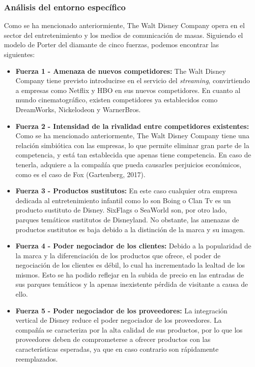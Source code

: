 \subsubsection{Análisis del entorno específico}
Como se ha mencionado anteriormiente, The Walt Disney Company opera en el sector del entretenimiento y los medios de comunicación de masas. Siguiendo el modelo de Porter del diamante de cinco fuerzas, podemos encontrar las siguientes:

\begin{itemize}

\item
\textbf{Fuerza 1 - Amenaza de nuevos competidores:} The Walt Disney Company tiene previsto introducirse en el servicio del \textit{streaming}, convirtiendo a empresas como Netflix y HBO en sus nuevos competidores. En cuanto al mundo cinematográfico, existen competidores ya establecidos como DreamWorks, Nickelodeon y WarnerBros.

\item
\textbf{Fuerza 2 - Intensidad de la rivalidad entre competidores existentes:} Como se ha mencionado anteriormente, The Walt Disney Company tiene una relación simbiótica con las empresas, lo que permite eliminar gran parte de la competencia, y está tan establecida que apenas tiene competencia. En caso de tenerla, adquiere a la compañía que pueda causarles perjuicios económicos, como es el caso de Fox (Gartenberg, 2017).

\item
\textbf{Fuerza 3 - Productos sustitutos:} En este caso cualquier otra empresa dedicada al entretenimiento infantil como lo son Boing o Clan Tv es un producto sustituto de Disney. SixFlags o SeaWorld son, por otro lado, parques temáticos sustitutos de Disneyland. No obstante, las amenazas de productos sustitutos es baja debido a la distinción de la marca y su imagen.

\item
\textbf{Fuerza 4 - Poder negociador de los clientes:} Debido a la popularidad de la marca y la diferenciación de los productos que ofrece, el poder de negociación de los clientes es débil, lo cual ha incrementado la lealtad de los mismos. Esto se ha podido reflejar en la subida de precio en las entradas de sus parques temáticos y la apenas inexistente pérdida de visitante a causa de ello.

\item
\textbf{Fuerza 5 - Poder negociador de los proveedores:} La integración vertical de Disney reduce el poder negociador de los proveedores. La compañía se caracteriza por la alta calidad de sus productos, por lo que los proveedores deben de comprometerse a ofrecer productos con las características esperadas, ya que en caso contrario son rápidamente reemplazados.

\end{itemize}